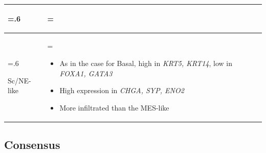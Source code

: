 \begin{table}[H]
\begin{tabularx}{\textwidth}{>{\hsize=.6\hsize\raggedright\arraybackslash}X >{\hsize=\hsize\arraybackslash}X}
\begin{itemize}[leftmargin=*, nosep, after=\vspace{-\baselineskip}]
    \end{itemize} \\
    \midrule
    Sc/NE-like & 
    \begin{itemize}[leftmargin=*, nosep, after=\vspace{-\baselineskip}]
        \item As in the case for Basal, high in \textit{KRT5, KRT14}, low in \textit{FOXA1, GATA3}
        \item High expression in\textit{ CHGA, SYP, ENO2}
        \item More infiltrated than the MES-like
    \end{itemize} \\
    \bottomrule
    \end{tabularx}
    \label{tab:lit:lund_genes}
\end{table}



\subsection{Consensus}


